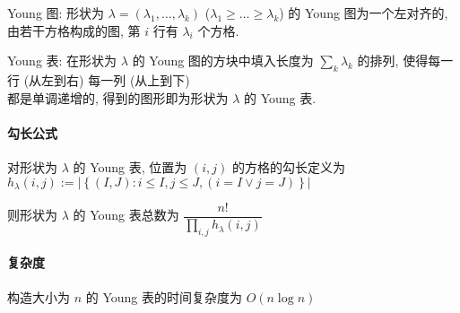 Young 图: 形状为 \(\lambda=(\lambda_1,\dots,\lambda_k)\) (\(\lambda_1\geq \dots\geq \lambda_k\)) 的 Young 图为一个左对齐的, 由若干方格构成的图, 第 \(i\) 行有 \(\lambda_i\) 个方格.

Young 表: 在形状为 \(\lambda\) 的 Young 图的方块中填入长度为 \(\sum_k \lambda_k\) 的排列, 使得每一行 (从左到右) 每一列 (从上到下) \\ 都是单调递增的, 得到的图形即为形状为 \(\lambda\) 的 Young 表.

\paragraph{勾长公式}

对形状为 \(\lambda\) 的 Young 表, 位置为 \((i,j)\) 的方格的勾长定义为 \(h_{\lambda}(i,j):=\left|\left\{(I,J):i\leq I, j\leq J,(i=I \lor j=J)\right\}\right|\)

则形状为 \(\lambda\) 的 Young 表总数为 \(\dfrac{n!}{\prod_{i,j} h_{\lambda}(i,j)}\)

\paragraph{复杂度}

构造大小为 \(n\) 的 Young 表的时间复杂度为 \(O(n\log n)\)
